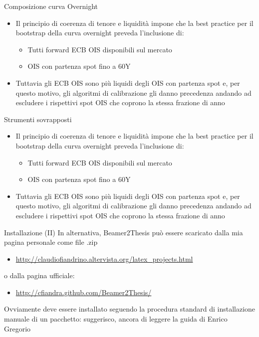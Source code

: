 \begin{tframe}{Composizione curva Overnight}
\begin{itemize}
\item Il principio di coerenza di tenore e liquidità impone che la best practice per il bootstrap della curva overnight preveda l'inclusione di:
    \begin{itemize}
    \item Tutti forward ECB OIS disponibili sul mercato
    \item OIS con partenza spot fino a 60Y
    \end{itemize}
\item Tuttavia gli ECB OIS sono più liquidi degli OIS con partenza spot e, per questo motivo, gli algoritmi di calibrazione gli danno precedenza andando ad escludere i rispettivi spot OIS che coprono la stessa frazione di anno    
\end{itemize}
\end{tframe}
\begin{tframe}{Strumenti sovrapposti}
\begin{itemize}
\item Il principio di coerenza di tenore e liquidità impone che la best practice per il bootstrap della curva overnight preveda l'inclusione di:
    \begin{itemize}
    \item Tutti forward ECB OIS disponibili sul mercato
    \item OIS con partenza spot fino a 60Y
    \end{itemize}
\item Tuttavia gli ECB OIS sono più liquidi degli OIS con partenza spot e, per questo motivo, gli algoritmi di calibrazione gli danno precedenza andando ad escludere i rispettivi spot OIS che coprono la stessa frazione di anno    
\end{itemize}
\end{tframe}
\begin{tframe}{Installazione (II)}
In alternativa, Beamer2Thesis può essere scaricato dalla mia pagina personale come file .zip
\begin{itemize}
\item \href{http://claudiofiandrino.altervista.org/latex\_projects.html}{http://claudiofiandrino.altervista.org/latex\_projects.html}
\end{itemize}
o dalla pagina ufficiale:
\begin{itemize}
\item \href{http://cfiandra.github.com/Beamer2Thesis/}{http://cfiandra.github.com/Beamer2Thesis/}
\end{itemize}
Ovviamente deve essere installato seguendo la procedura standard di installazione manuale di un pacchetto: suggerisco, ancora di leggere la guida di Enrico Gregorio
\end{tframe}
